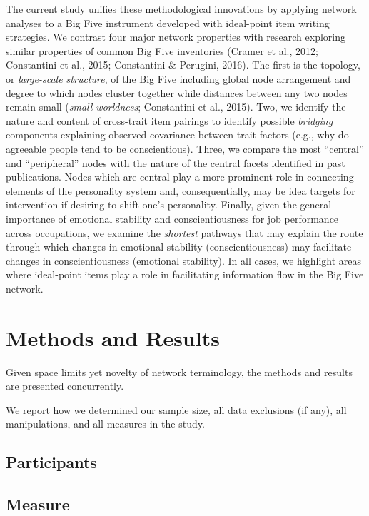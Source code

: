 \documentclass[english,man]{apa6}
\theoremstyle{definition}
\theoremstyle{definition}
\theoremstyle{remark}
\begin{document}
The current study unifies these methodological innovations by applying
network analyses to a Big Five instrument developed with ideal-point
item writing strategies. We contrast four major network properties with
research exploring similar properties of common Big Five inventories
(Cramer et al., 2012; Constantini et al., 2015; Constantini \& Perugini,
2016). The first is the topology, or \emph{large-scale structure}, of
the Big Five including global node arrangement and degree to which nodes
cluster together while distances between any two nodes remain small
(\emph{small-worldness}; Constantini et al., 2015). Two, we identify the
nature and content of cross-trait item pairings to identify possible
\emph{bridging} components explaining observed covariance between trait
factors (e.g., why do agreeable people tend to be conscientious). Three,
we compare the most \enquote{central} and \enquote{peripheral} nodes
with the nature of the central facets identified in past publications.
Nodes which are central play a more prominent role in connecting
elements of the personality system and, consequentially, may be idea
targets for intervention if desiring to shift one's personality.
Finally, given the general importance of emotional stability and
conscientiousness for job performance across occupations, we examine the
\emph{shortest} pathways that may explain the route through which
changes in emotional stability (conscientiousness) may facilitate
changes in conscientiousness (emotional stability). In all cases, we
highlight areas where ideal-point items play a role in facilitating
information flow in the Big Five network.

\section{\texorpdfstring{\textbf{Methods and
Results}}{Methods and Results}}\label{methods-and-results}

Given space limits yet novelty of network terminology, the methods and
results are presented concurrently.

We report how we determined our sample size, all data exclusions (if
any), all manipulations, and all measures in the study.

\subsection{Participants}\label{participants}

\subsection{Measure}\label{measure}
\end{document}

